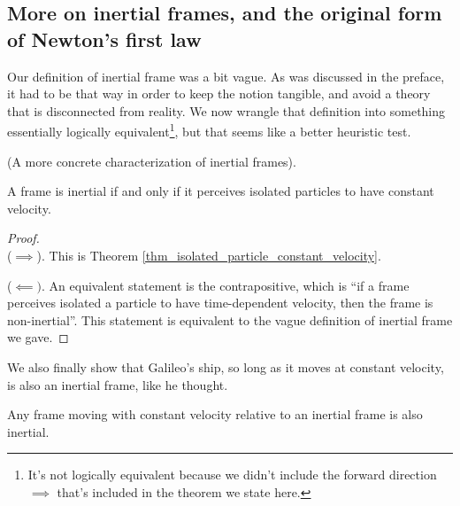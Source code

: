 \documentclass{article}
\begin{document}
\addtocounter{footnote}{-2}

\subsection*{More on inertial frames, and the original form of Newton's first law}

Our definition of inertial frame was a bit vague. As was discussed in the preface, it had to be that way in order to keep the notion tangible, and avoid a theory that is disconnected from reality. We now wrangle that definition into something essentially logically equivalent\footnote{It's not logically equivalent because we didn't include the forward direction $\implies$ that's included in the theorem we state here.}, but that seems like a better heuristic test.

\begin{theorem}
\label{thm_inertial_frame_concrete_characterization}
    (A more concrete characterization of inertial frames).
    
    A frame is inertial if and only if it perceives isolated particles to have constant velocity.
\end{theorem}

\begin{proof}
    \mbox{} \\ \indent
    ($\implies$). This is Theorem \ref{thm_isolated_particle_constant_velocity}.
    
    ($\impliedby)$. An equivalent statement is the contrapositive, which is ``if a frame perceives isolated a particle to have time-dependent velocity, then the frame is non-inertial''. This statement is equivalent to the vague definition of inertial frame we gave.
\end{proof}

We also finally show that Galileo's ship, so long as it moves at constant velocity, is also an inertial frame, like he thought.

\begin{theorem}
\label{thm_family_inertial_frames_constant_velocity}
    Any frame moving with constant velocity relative to an inertial frame is also inertial.
\end{theorem}
\end{document}
